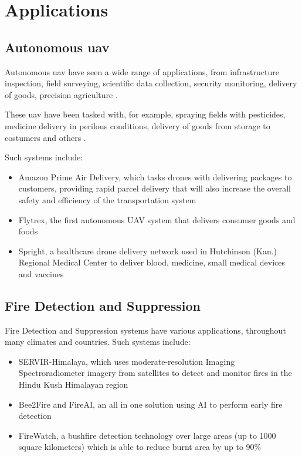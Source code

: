 \documentclass[runningheads]{llncs}
\begin{document}
\section{Applications}

\subsection{Autonomous \acrshort{uav}}

Autonomous \acrshort{uav} have seen a wide range of applications, from  infrastructure inspection, field surveying, scientific data collection, security monitoring, delivery of goods, precision agriculture \cite{Malka_2017}.

These \acrshort{uav} have been tasked with, for example, spraying fields with pesticides, medicine delivery in perilous conditions, delivery of goods from storage to costumers and others \cite{Malka_2017}.

Such systems include:

\begin{itemize}
	\item Amazon Prime Air Delivery, which tasks drones with delivering packages to customers, providing rapid parcel delivery that will also increase the overall safety and efficiency of the transportation system \cite{article}
	\item Flytrex, the first autonomous UAV system that delivers consumer goods and foods \cite{Malka_2017}
	\item Spright, a healthcare drone delivery network used in Hutchinson (Kan.) Regional Medical Center to deliver blood, medicine, small medical devices and vaccines \cite{Drees_2021}
\end{itemize}

\subsection{Fire Detection and Suppression}

Fire Detection and Suppression systems have various applications, throughout many climates and countries. Such systems include:

\begin{itemize}
	\item SERVIR-Himalaya, which uses moderate-resolution Imaging Spectroradiometer imagery from satellites to detect and monitor fires in the Hindu Kush Himalayan region \cite{SERVIR_2012}
	\item Bee2Fire and FireAI, an all in one solution using AI to perform early fire detection \cite{SilvaPinto_2021}
	\item FireWatch, a bushfire detection technology over large areas (up to 1000 square kilometers) which is able to reduce burnt area by up to 90\% \cite{FireWatchAustralia_2010}
\end{itemize}
\end{document}
